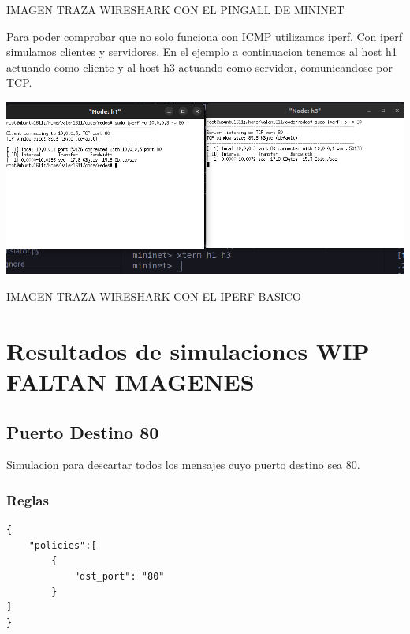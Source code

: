 \documentclass{article}
\begin{document}
IMAGEN TRAZA WIRESHARK CON EL PINGALL DE MININET
\begin{center}
\end{center}


Para poder comprobar que no solo funciona con ICMP utilizamos iperf. Con iperf simulamos
clientes y servidores. En el ejemplo a continuacion tenemos al host h1 actuando como cliente
y al host h3 actuando como servidor, comunicandose por TCP.

\begin{center}
\includegraphics[scale=0.37]{mininet_iperf_basico.png}
\end{center}

IMAGEN TRAZA WIRESHARK CON EL IPERF BASICO
\begin{center}
\end{center}

\newpage
\section{\texorpdfstring{\textbf{Resultados de simulaciones WIP FALTAN IMAGENES}}{Resultados de simulaciones}}\label{pruebas-wip}

\subsection{Puerto Destino 80}
Simulacion para descartar todos los mensajes cuyo puerto destino sea 80.

\subsubsection{Reglas}
\begin{center}
\end{center}

\begin{verbatim}
{
    "policies":[
        {
            "dst_port": "80"
        }
]
}
\end{verbatim}
\end{document}
